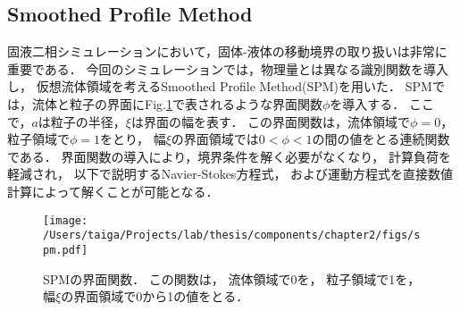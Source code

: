 \subsection{Smoothed Profile Method}
固液二相シミュレーションにおいて，固体-液体の移動境界の取り扱いは非常に重要である．
今回のシミュレーションでは，物理量とは異なる識別関数を導入し，
仮想流体領域を考えるSmoothed Profile Method(SPM)\cite{spm}を用いた．
SPMでは，流体と粒子の界面にFig.\ref{fig:spm}で表されるような界面関数$\phi$を導入する．
ここで，$a$は粒子の半径，$\xi$は界面の幅を表す．
この界面関数は，流体領域で$\phi=0$，粒子領域で$\phi=1$をとり，
幅$\xi$の界面領域では$0< \phi <1$の間の値をとる連続関数である．
界面関数の導入により，境界条件を解く必要がなくなり，
計算負荷を軽減され，
以下で説明するNavier-Stokes方程式，
および運動方程式を直接数値計算によって解くことが可能となる．
    \begin{figure}[H]
        \centering
        \texttt{[image: /Users/taiga/Projects/lab/thesis/components/chapter2/figs/spm.pdf]}
        \caption{SPMの界面関数．
        この関数は，
        流体領域で0を，
        粒子領域で1を，
        幅$\xi$の界面領域で0から1の値をとる．}
        \label{fig:spm}
    \end{figure}

